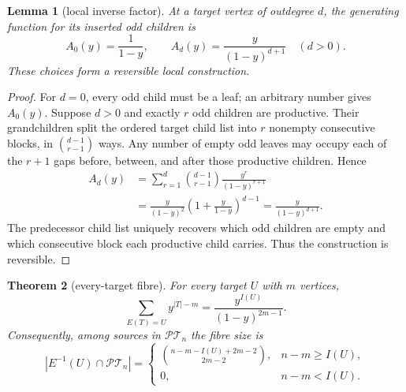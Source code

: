 \documentclass[a4paper,10pt]{amsart}
\newtheorem{theorem}{Theorem}
\newtheorem{lemma}[theorem]{Lemma}
\theoremstyle{definition}
\theoremstyle{remark}
\newcommand{\PT}{\mathcal{PT}}
\begin{document}
\begin{lemma}[local inverse factor]\label{lem:local}
At a target vertex of outdegree $d$, the generating function for its inserted
odd children is
\begin{equation}\label{eq:local-factor}
 A_0(y)=\frac1{1-y},
 \qquad
 A_d(y)=\frac{y}{(1-y)^{d+1}}\quad(d>0).
\end{equation}
These choices form a reversible local construction.
\end{lemma}

\begin{proof}
For $d=0$, every odd child must be a leaf; an arbitrary number gives
$A_0(y)$.  Suppose $d>0$ and exactly $r$ odd children are productive.  Their
grandchildren split the ordered target child list into $r$ nonempty
consecutive blocks, in $\binom{d-1}{r-1}$ ways.  Any number of empty odd
leaves may occupy each of the $r+1$ gaps before, between, and after those
productive children.  Hence
\begin{align*}
 A_d(y)
 &=\sum_{r=1}^d\binom{d-1}{r-1}\frac{y^r}{(1-y)^{r+1}}\\
 &=\frac{y}{(1-y)^2}
   \left(1+\frac{y}{1-y}\right)^{d-1}
 =\frac{y}{(1-y)^{d+1}}.
\end{align*}
The predecessor child list uniquely recovers which odd children are empty
and which consecutive block each productive child carries.  Thus the
construction is reversible.
\end{proof}

\begin{theorem}[every-target fibre]\label{thm:fibre}
For every target $U$ with $m$ vertices,
\begin{equation}\label{eq:fibre-series}
 \sum_{E(T)=U}y^{|T|-m}
       =\frac{y^{I(U)}}{(1-y)^{2m-1}}.
\end{equation}
Consequently, among sources in $\PT_n$ the fibre size is
\begin{equation}\label{eq:fibre-coefficient}
 |E^{-1}(U)\cap\PT_n|=
 \begin{cases}
 \displaystyle\binom{n-m-I(U)+2m-2}{2m-2},&n-m\ge I(U),\\[6pt]
 0,&n-m<I(U).
 \end{cases}
\end{equation}
\end{theorem}
\end{document}
